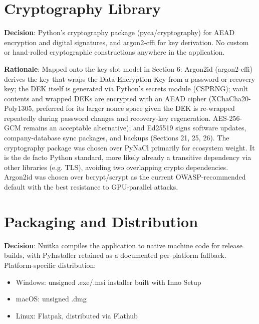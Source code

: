 \section{Cryptography Library}
\textbf{Decision}:  Python's cryptography package (pyca/cryptography) for AEAD encryption and digital signatures, and argon2-cffi for key derivation. No custom or hand-rolled cryptographic constructions anywhere in the application.

\textbf{Rationale}:  Mapped onto the key-slot model in Section 6: Argon2id (argon2-cffi) derives the key that wraps the Data Encryption Key from a password or recovery key; the DEK itself is generated via Python's secrets module (CSPRNG); vault contents and wrapped DEKs are encrypted with an AEAD cipher (XChaCha20-Poly1305, preferred for its larger nonce space given the DEK is re-wrapped repeatedly during password changes and recovery-key regeneration. AES-256-GCM remains an acceptable alternative); and Ed25519 signs software updates, company-database sync packages, and backups (Sections 21, 25, 26). The cryptography package was chosen over PyNaCl primarily for ecosystem weight. It is the de facto Python standard, more likely already a transitive dependency via other libraries (e.g. TLS), avoiding two overlapping crypto dependencies. Argon2id was chosen over bcrypt/scrypt as the current OWASP-recommended default with the best resistance to GPU-parallel attacks.
\section{Packaging and Distribution}
\textbf{Decision}:  Nuitka compiles the application to native machine code for release builds, with PyInstaller retained as a documented per-platform fallback. Platform-specific distribution:

\begin{itemize}
	\item[] Windows: unsigned .exe/.msi installer built with Inno Setup
	\item[] macOS: unsigned .dmg
	\item[] Linux: Flatpak, distributed via Flathub
\end{itemize}

